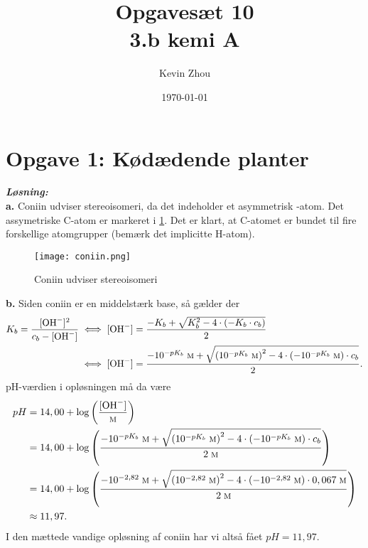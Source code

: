\documentclass{report}
\title{Opgavesæt 10\\
{\Large \textbf{3.b kemi A}}}
\author{Kevin Zhou}
\date{\today}
\newcommand{\sol}{\setlength{\parindent}{0cm}\textbf{\textit{Løsning:}}\setlength{\parindent}{1cm}}
\begin{document}
\maketitle
\section*{Opgave 1: Kødædende planter}
\sol \\
\textbf{a.}
Coniin udviser stereoisomeri, da det indeholder et asymmetrisk -atom.
Det assymetriske C-atom er markeret i \cref{fig:coniin}. 
Det er klart, at C-atomet er bundet til fire forskellige atomgrupper (bemærk det implicitte H-atom).
\begin{figure}[H]
\begin{center}
  \texttt{[image: coniin.png]}
\end{center}
\caption{Coniin udviser stereoisomeri}
\label{fig:coniin}
\end{figure}
\noindent \textbf{b.}
Siden coniin er en middelstærk base, så gælder der
\begin{equation*}
\begin{split}
K_b = \frac{[\ce{OH-} ]^2}{c_b - [\ce{OH-}]} &\iff [\ce{OH-}]=\frac{-K_b + \sqrt{K_b^2-4 \cdot \left(-K_b \cdot c_b\right) } }{2}\\
&\iff [\ce{OH-}]=\frac{-10 ^{-pK_b} \;\unit{\textsc{m}} + \sqrt{\left(10 ^{-pK_b} \;\unit{\textsc{m}} \right) ^2-4 \cdot \left(-10 ^{-pK_b} \;\unit{\textsc{m}}\right) \cdot c_b } }{2}.
\end{split}
\end{equation*}
pH-værdien i opløsningen må da være
\begin{equation*}
\begin{split}
pH&=14,00 + \log\left(\frac{[\ce{OH-} ]}{\unit{\textsc{m}} }\right) \\
&=14,00 + \log\left(\frac{-10 ^{-pK_b} \;\unit{\textsc{m}} + \sqrt{\left(10 ^{-pK_b} \;\unit{\textsc{m}} \right) ^2-4 \cdot \left(-10 ^{-pK_b} \;\unit{\textsc{m}}\right) \cdot c_b } }{2 \;\unit{\textsc{m}} }\right) \\
&=14,00 + \log\left(\frac{-10 ^{-2,82} \;\unit{\textsc{m}} + \sqrt{\left(10 ^{-2,82} \;\unit{\textsc{m}} \right) ^2-4 \cdot \left(-10 ^{-2,82} \;\unit{\textsc{m}}\right) \cdot 0,067 \;\unit{\textsc{m}} } }{2 \;\unit{\textsc{m}} }\right) \\
&\approx 11,97.
\end{split}
\end{equation*}
I den mættede vandige opløsning af coniin har vi altså fået $pH=11,97$.\\[1ex]
\end{document}
